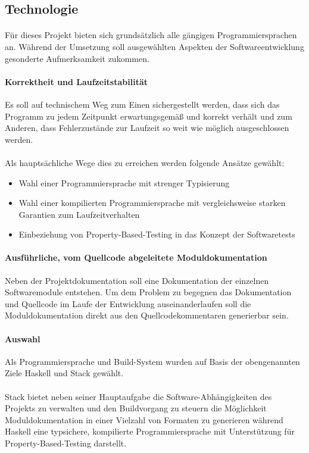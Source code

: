 \subsection{Technologie}
\paragraph{}
Für dieses Projekt bieten sich grundsätzlich alle gängigen Programmiersprachen
an. Während der Umsetzung soll ausgewählten Aspekten der Softwareentwicklung
gesonderte Aufmerksamkeit zukommen.

\paragraph{Korrektheit und Laufzeitstabilität} Es soll auf technischem Weg zum
Einen sichergestellt werden, dass sich das Programm zu jedem Zeitpunkt erwartungsgemäß
und korrekt verhält und zum Anderen, dass Fehlerzustände zur Laufzeit so weit
wie möglich ausgeschlossen werden.

\paragraph{}
Als hauptsächliche Wege dies zu erreichen werden folgende Ansätze gewählt:

\begin{itemize}
    \item Wahl einer Programmiersprache mit strenger Typisierung
    \item Wahl einer kompilierten Programmiersprache mit vergleichsweise starken
          Garantien zum Laufzeitverhalten
    \item Einbeziehung von \gls{Property-Based-Testing} \cite{property-based-testing} in das Konzept der Softwaretests
\end{itemize}

\paragraph{Ausführliche, vom Quellcode abgeleitete Moduldokumentation}
Neben der Projektdokumentation soll eine Dokumentation der einzelnen
Softwaremodule entstehen. Um dem Problem zu begegnen das Dokumentation und
Quellcode im Laufe der Entwicklung auseinanderlaufen soll die Moduldokumentation
direkt aus den Quellcodekommentaren generierbar sein.

\paragraph{Auswahl}
Als Programmiersprache und Build-System wurden auf Basis der obengenannten Ziele
Haskell \cite{haskell} und Stack \cite{stack} gewählt.

\paragraph{}
Stack bietet neben seiner Hauptaufgabe die Software-Abhängigkeiten des Projekts
zu verwalten und den Buildvorgang zu steuern die Möglichkeit Moduldokumentation
in einer Vielzahl von Formaten zu generieren während Haskell eine typsichere,
kompilierte Programmiersprache mit Unterstützung für \gls{Property-Based-Testing}
darstellt.